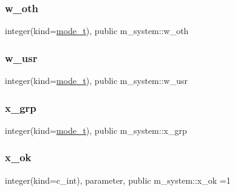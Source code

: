 \subsubsection{\texorpdfstring{w\+\_\+oth}{w\_oth}}
{\footnotesize\ttfamily integer(kind=\mbox{\hyperlink{namespacem__system_abdb5cc27c945379d844db4830d499050}{mode\+\_\+t}}), public m\+\_\+system\+::w\+\_\+oth}

\mbox{\label{namespacem__system_ace39a3c0b26d21381c2956b78a8822d5}} 
\subsubsection{\texorpdfstring{w\+\_\+usr}{w\_usr}}
{\footnotesize\ttfamily integer(kind=\mbox{\hyperlink{namespacem__system_abdb5cc27c945379d844db4830d499050}{mode\+\_\+t}}), public m\+\_\+system\+::w\+\_\+usr}

\mbox{\label{namespacem__system_ae405a76caed1088a151c437d66d80eb0}} 
\subsubsection{\texorpdfstring{x\+\_\+grp}{x\_grp}}
{\footnotesize\ttfamily integer(kind=\mbox{\hyperlink{namespacem__system_abdb5cc27c945379d844db4830d499050}{mode\+\_\+t}}), public m\+\_\+system\+::x\+\_\+grp}

\mbox{\label{namespacem__system_a0eca0d5b431ad6fbde6f40407550e7aa}} 
\subsubsection{\texorpdfstring{x\+\_\+ok}{x\_ok}}
{\footnotesize\ttfamily integer(kind=c\+\_\+int), parameter, public m\+\_\+system\+::x\+\_\+ok =1}

\mbox{\label{namespacem__system_a5863ec37dc7d85f9c3f20cc511d26bb4}} 
